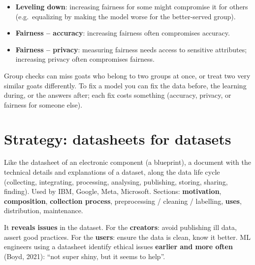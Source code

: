 \documentclass[11pt,a4paper,openany]{book}
\begin{document}
\begin{keybox}[title={Three ethical dilemmas (``trade-offs'')}]
\begin{itemize}
  \item \textbf{Leveling down}: increasing fairness for some might compromise it for others
        (e.g.\ equalizing by making the model worse for the better-served group).
  \item \textbf{Fairness -- accuracy}: increasing fairness often compromises accuracy.
  \item \textbf{Fairness -- privacy}: measuring fairness needs access to sensitive attributes;
        increasing privacy often compromises fairness.
\end{itemize}
\end{keybox}

\begin{goatbox}
Group checks can miss goats who belong to two groups at once, or treat two very similar goats
differently. To fix a model you can fix the data before, the learning during, or the answers
after; each fix costs something (accuracy, privacy, or fairness for someone else).
\end{goatbox}


\section{Strategy: datasheets for datasets}

\begin{defnbox}[title={Datasheets for datasets (Gebru et al., 2021)}]
Like the datasheet of an electronic component (a blueprint), a document with the technical
details and explanations of a dataset, along the data life cycle (collecting, integrating,
processing, analysing, publishing, storing, sharing, finding). Used by IBM, Google, Meta,
Microsoft. Sections: \textbf{motivation}, \textbf{composition}, \textbf{collection process},
preprocessing / cleaning / labelling, \textbf{uses}, distribution, maintenance.
\end{defnbox}

\begin{propbox}[title={Why use it?}]
It \textbf{reveals issues} in the dataset. For the \textbf{creators}: avoid publishing ill data,
assert good practices. For the \textbf{users}: ensure the data is clean, know it better.
ML engineers using a datasheet identify ethical issues \textbf{earlier and more often} (Boyd,
2021): ``not super shiny, but it seems to help''.
\end{propbox}
\end{document}
